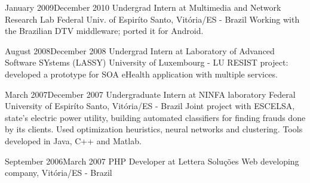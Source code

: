 \documentclass{friggeri-cv}
\begin{document}
\workentry
  {January 2009}{December 2010}
  {Undergrad Intern at Multimedia and Network Research Lab}
  {Federal Univ. of Espiríto Santo, Vitória/ES - Brazil}
  {Working with the Brazilian DTV middleware; ported it for Android. }

\workentry
  {August 2008}{December 2008}
  {Undergrad Intern at Laboratory of Advanced Software SYstems (LASSY)}
  {University of Luxembourg - LU}
  {RESIST project: developed a prototype for SOA eHealth application with multiple services.}


\workentry
  {March 2007}{December 2007}
  {Undergraduate Intern at NINFA laboratory}
  {Federal University of Espiríto Santo, Vitória/ES - Brazil}
  {Joint project with ESCELSA, state's electric power utility, building automated classifiers
  for finding frauds done by its clients. Used optimization heuristics, neural networks and clustering.
  Tools developed in Java, C++ and Matlab.}

\workentry
  {September 2006}{March 2007}
  {PHP Developer at Lettera Soluções}
  {Web developing company, Vitória/ES - Brazil}
  {}%

\end{document}
